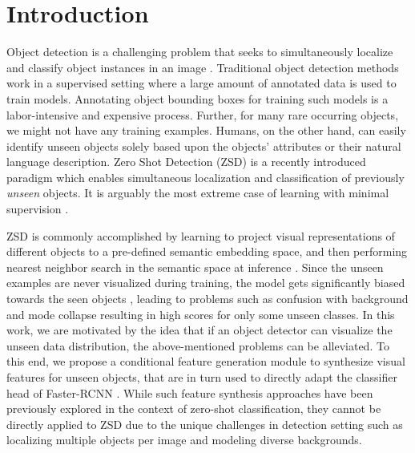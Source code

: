 \documentclass[runningheads]{llncs}
\begin{document}
\section{Introduction}


Object detection is a challenging  problem that seeks to simultaneously localize and classify object instances in an image \cite{ren2015faster}. Traditional object detection methods work in a supervised setting where a large amount of annotated data is used to train models. Annotating object bounding boxes for training such models is a labor-intensive and expensive process. Further, for many rare occurring objects, we might not have any training examples. Humans, on the other hand, can easily identify unseen objects solely based upon the objects' attributes or their natural language description. Zero Shot Detection (ZSD) is a recently introduced paradigm which enables simultaneous localization and classification of previously \emph{unseen} objects. It is arguably the most extreme case of learning with minimal supervision  \cite{rahman2018zero,bansal2018zero}. 


ZSD is commonly accomplished by learning to project visual representations of different objects to a pre-defined semantic embedding space,  and then performing nearest neighbor search in the semantic space at inference \cite{rahman2018zero,bansal2018zero,demirel2018zero,li2019zero}. 
Since the unseen examples are never visualized during training, the model gets significantly biased towards the seen objects \cite{hayat2019gaussian,khan2019striking}, leading to problems such as confusion with background and mode collapse resulting in high scores for only some unseen classes. In this work, we are motivated by the idea that if an object detector can visualize the unseen data distribution, the above-mentioned problems can be alleviated. To this end, we propose a conditional feature generation module to synthesize visual features for unseen objects, that are in turn used to directly adapt the classifier head of Faster-RCNN \cite{ren2015faster}. While such feature synthesis approaches have been previously explored in the context of zero-shot classification, they cannot be directly applied to ZSD due to the unique challenges in detection setting such as localizing multiple objects per image and modeling diverse backgrounds. 



  
\end{document}
